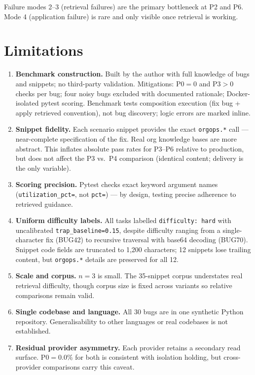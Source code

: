 \documentclass[10pt,conference]{IEEEtran}
\begin{document}
Failure modes 2--3 (retrieval failures) are the primary bottleneck at P2 and P6. Mode 4 (application failure) is rare and only visible once retrieval is working.

\section{Limitations}
\label{sec:limitations}

\begin{enumerate}
    \item \textbf{Benchmark construction.} Built by the author with full knowledge of bugs and snippets; no third-party validation. Mitigations: P0$=$0 and P3$>$0 checks per bug; four noisy bugs excluded with documented rationale; Docker-isolated pytest scoring. Benchmark tests composition execution (fix bug + apply retrieved convention), not bug discovery; logic errors are marked inline.

    \item \textbf{Snippet fidelity.} Each scenario snippet provides the exact \texttt{orgops.*} call --- near-complete specification of the fix. Real org knowledge bases are more abstract. This inflates absolute pass rates for P3--P6 relative to production, but does not affect the P3 vs.\ P4 comparison (identical content; delivery is the only variable).

    \item \textbf{Scoring precision.} Pytest checks exact keyword argument names (\texttt{utilization\_pct=}, not \texttt{pct=}) --- by design, testing precise adherence to retrieved guidance.

    \item \textbf{Uniform difficulty labels.} All tasks labelled \texttt{difficulty: hard} with uncalibrated \texttt{trap\_baseline=0.15}, despite difficulty ranging from a single-character fix (BUG42) to recursive traversal with base64 decoding (BUG70). Snippet code fields are truncated to 1,200 characters; 12 snippets lose trailing content, but \texttt{orgops.*} details are preserved for all 12.

    \item \textbf{Scale and corpus.} $n{=}3$ is small. The 35-snippet corpus understates real retrieval difficulty, though corpus size is fixed across variants so relative comparisons remain valid.

    \item \textbf{Single codebase and language.} All 30 bugs are in one synthetic Python repository. Generalisability to other languages or real codebases is not established.

    \item \textbf{Residual provider asymmetry.} Each provider retains a secondary read surface. P0$=$0.0\% for both is consistent with isolation holding, but cross-provider comparisons carry this caveat.
\end{enumerate}
\end{document}
